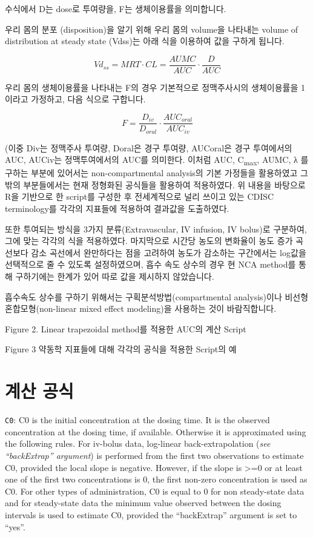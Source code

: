 \documentclass[
  12pt,
]{krantz}
\begin{document}
수식에서 D는 dose로 투여량을, F는 생체이용률을 의미합니다.

우리 몸의 분포 (disposition)을 알기 위해 우리 몸의 volume을 나타내는 volume of distribution at steady state (Vdss)는 아래 식을 이용하여 값을 구하게 됩니다.

\[
Vd_{ss} = MRT \cdot CL = \frac{AUMC}{AUC} \cdot \frac{D}{AUC}
\]

우리 몸의 생체이용률을 나타내는 F의 경우 기본적으로 정맥주사시의 생체이용률을 1이라고 가정하고, 다음 식으로 구합니다.

\[
F = \frac{D_{iv}}{D_{oral}} \cdot \frac{AUC_{oral}}{AUC_{iv}}
\]

(이중 Div는 정맥주사 투여량, Doral은 경구 투여량, AUCoral은 경구 투여에서의 AUC, AUCiv는 정맥투여에서의 AUC를 의미한다.
이처럼 AUC, C\textsubscript{max}, AUMC, λ 를 구하는 부분에 있어서는 non-compartmental analysis의 기본 가정들을 활용하였고 그 밖의 부분들에서는 현재 정형화된 공식들을 활용하여 적용하였다.
위 내용을 바탕으로 R을 기반으로 한 script를 구성한 후 전세계적으로 널리 쓰이고 있는 CDISC terminology를 각각의 지표들에 적용하여 결과값을 도출하였다.

또한 투여되는 방식을 3가지 분류(Extravascular, IV infusion, IV bolus)로 구분하여, 그에 맞는 각각의 식을 적용하였다.
마지막으로 시간당 농도의 변화율이 농도 증가 곡선보다 감소 곡선에서 완만하다는 점을 고려하여 농도가 감소하는 구간에서는 log값을 선택적으로 줄 수 있도록 설정하였으며, 흡수 속도 상수의 경우 현 NCA method를 통해 구하기에는 한계가 있어 따로 값을 제시하지 않았습니다.

흡수속도 상수를 구하기 위해서는 구획분석방법(compartmental analysis)이나 비선형 혼합모형(non-linear mixed effect modeling)을 사용하는 것이 바람직합니다.

Figure 2. Linear trapezoidal method를 적용한 AUC의 계산 Script

Figure 3 약동학 지표들에 대해 각각의 공식을 적용한 Script의 예

\hypertarget{uxacc4uxc0b0-uxacf5uxc2dd}{%
\section{계산 공식}\label{uxacc4uxc0b0-uxacf5uxc2dd}}

\texttt{C0}: C0 is the initial concentration at the dosing time. It is the observed concentration at the dosing time, if available. Otherwise it is approximated using the following rules. For iv-bolus data, log-linear back-extrapolation (\emph{see ``backExtrap'' argument}) is performed from the first two observations to estimate C0, provided the local slope is negative. However, if the slope is \textgreater=0 or at least one of the first two concentrations is 0, the first non-zero concentration is used as C0. For other types of administration, C0 is equal to 0 for non steady-state data and for steady-state data the minimum value observed between the dosing intervals is used to estimate C0, provided the ``backExtrap'' argument is set to ``yes''.
\end{document}
